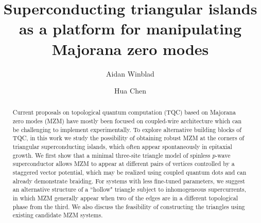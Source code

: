 \documentclass[aps,prb,showpacs,amsmath,twocolumn,amssymb,superscriptaddress]{revtex4-2}
\begin{document}
\title{Superconducting triangular islands as a platform for manipulating Majorana zero modes}

\author{Aidan Winblad}

\author{Hua Chen}

\begin{abstract}
Current proposals on topological quantum computation (TQC) based on Majorana zero modes (MZM) have mostly been focused on coupled-wire architecture which can be challenging to implement experimentally. To explore alternative building blocks of TQC, in this work we study the possibility of obtaining robust MZM at the corners of triangular superconducting islands, which often appear spontaneously in epitaxial growth. We first show that a minimal three-site triangle model of spinless $p$-wave superconductor allows MZM to appear at different pairs of vertices controlled by a staggered vector potential, which may be realized using coupled quantum dots and can already demonstrate braiding. For systems with less fine-tuned parameters, we suggest an alternative structure of a ``hollow" triangle subject to inhomogeneous supercurrents, in which MZM generally appear when two of the edges are in a different topological phase from the third. We also discuss the feasibility of constructing the triangles using existing candidate MZM systems.
\end{abstract}


\maketitle
\end{document}
